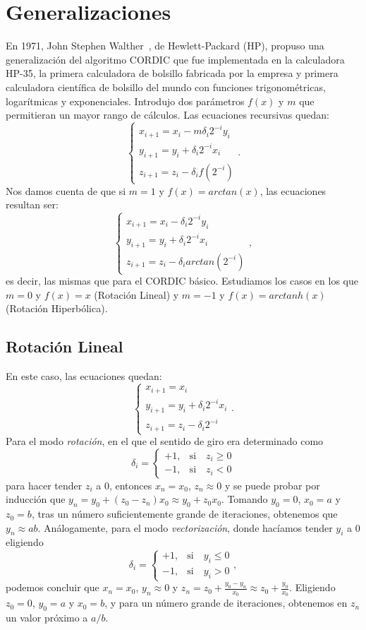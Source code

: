 \documentclass[12pt, a4paper]{article}
\begin{document}
 \section{Generalizaciones}
En 1971, John Stephen Walther~\cite{10.1145/1478786.1478840}\cite{10.5555/352135.2812970}, de  Hewlett-Packard (HP), propuso una generalización del algoritmo CORDIC que fue implementada en la calculadora HP-35, la primera calculadora de bolsillo fabricada por la empresa y primera calculadora científica de bolsillo del mundo con funciones trigonométricas, logarítmicas y exponenciales. Introdujo dos parámetros $f(x)$ y $m$ que permitieran un mayor rango de cálculos. Las ecuaciones recursivas quedan:
\[
\begin{cases}
x_{i+1}=x_{i}-m\delta_{i}2^{-i}y_i\\
y_{i+1}=y_{i}+\delta_{i}2^{-i}x_i\\
z_{i+1}=z_{i}-\delta_{i}f(2^{-i})
\end{cases}.
\]
Nos damos cuenta de que si $m=1$ y $f(x)=arctan(x)$, las ecuaciones resultan ser:
\[
\begin{cases}
x_{i+1}=x_{i}-\delta_{i}2^{-i}y_i\\
y_{i+1}=y_{i}+\delta_{i}2^{-i}x_i\\
z_{i+1}=z_{i}-\delta_{i}arctan(2^{-i})
\end{cases},
\]
es decir, las mismas que para el CORDIC básico.
Estudiamos los casos en los que $m=0$ y $f(x)=x$ (Rotación Lineal) y $m=-1$ y $f(x)=arctanh(x)$ (Rotación Hiperbólica).
 \subsection{Rotación Lineal}
 En este caso, las ecuaciones quedan:
 \[
\begin{cases}
x_{i+1}=x_{i}\\
y_{i+1}=y_{i}+\delta_{i}2^{-i}x_i\\
z_{i+1}=z_{i}-\delta_{i}2^{-i}
\end{cases}.
\]
Para el modo \textit{rotación}, en el que el sentido de giro era determinado como \[ \delta_i=\begin{cases}
+1,&\mathrm{ si }\quad z_{i}\geq0\\
-1,&\mathrm{ si }\quad z_{i}<0
\end{cases}\] para hacer tender $z_i$ a 0, entonces $x_n=x_0$, $z_n\approx 0$ y se puede probar por inducción que $y_n=y_0+(z_0-z_n)x_0\approx y_0+z_0x_0$. Tomando $y_0=0$, $x_0=a$ y $z_0=b$, tras un número suficientemente grande de iteraciones, obtenemos que $y_n\approx ab$. Análogamente, para el modo \textit{vectorización}, donde hacíamos tender $y_i$ a 0 eligiendo 
\[ \delta_i=\begin{cases}
+1,&\mathrm{ si }\quad y_{i}\leq0\\
-1,&\mathrm{ si }\quad y_{i}>0
\end{cases},\]podemos concluir que  $x_n=x_0$, $y_n\approx 0$ y $z_n=z_0+\frac{y_0-y_n}{x_0}\approx z_0+\frac{y_0}{x_0}$. Eligiendo $z_0=0$, $y_0=a$ y $x_0=b$, y para un número grande de iteraciones, obtenemos en $z_n$ un valor próximo a $a/b$.
\end{document}
